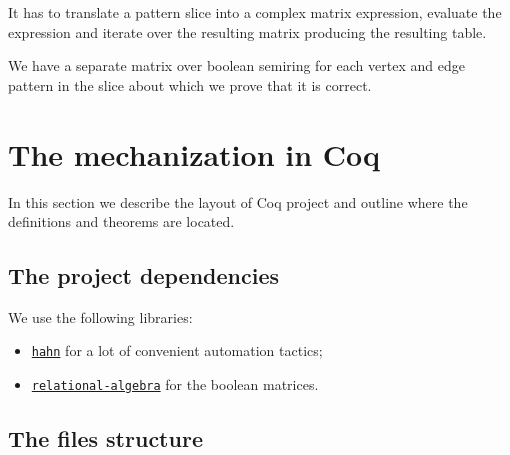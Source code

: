 \documentclass[14pt]{constructor-thesis}
\theoremstyle{definition}
\begin{document}
It has to translate a pattern slice into a complex matrix expression, evaluate the expression and iterate over the resulting matrix producing the resulting table. 

We have a separate matrix over boolean semiring for each vertex and edge pattern in the slice about which we prove that it is correct.

\section{The mechanization in Coq}

In this section we describe the layout of Coq project and outline where the definitions and theorems are located.

\subsection{The project dependencies}

We use the following libraries:
\begin{itemize}
  \item \href{https://github.com/vafeiadis/hahn}{\texttt{hahn}} for a lot of convenient automation tactics;
  \item \href{http://perso.ens-lyon.fr/damien.pous/ra/}{\texttt{relational-algebra}} for the boolean matrices.
\end{itemize}

\subsection{The files structure}
\end{document}
